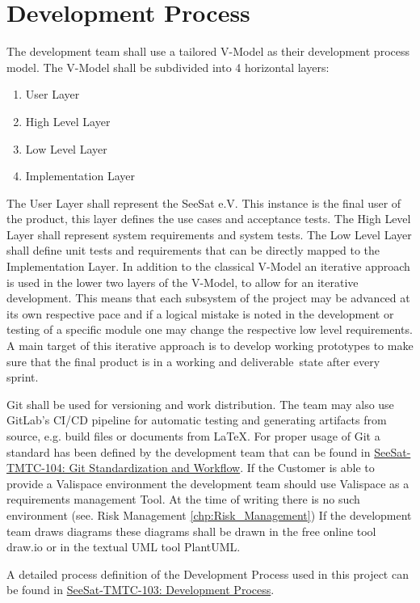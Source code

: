 \chapter{Development Process}

The development team shall use a tailored V-Model as their development process model. The V-Model shall be subdivided into 4 horizontal layers:

\begin{enumerate}
    \item User Layer
    \item High Level Layer
    \item Low Level Layer
    \item Implementation Layer
\end{enumerate}

The User Layer shall represent the SeeSat e.V. This instance is the final user of the product, this layer defines the use cases and acceptance tests. The High Level Layer shall represent system requirements and system tests. The Low Level Layer shall define unit tests and requirements that can be directly mapped to the Implementation Layer.
In addition to the classical V-Model an iterative approach is used in the lower two layers of the V-Model, to allow for an iterative development. This means that each subsystem of the project may be advanced at its own respective pace and if a logical mistake is noted in the development or testing of a specific module one may change the respective low level requirements. A main target of this iterative approach is to develop working prototypes to make sure that the final product is in a working and  \glqq deliverable\grqq~state after every sprint.

Git shall be used for versioning and work distribution. The team may also use GitLab's CI/CD pipeline for automatic testing and generating artifacts from source, e.g. build files or documents from \LaTeX. For proper usage of Git a standard has been defined by the development team that can be found in \href{https://nc.seesat.eu/apps/files/files/220350?dir=/Project/ERWIN/Engineering/TMTC/CCSDS-Stack/2.%20Iteration%20%28TSL23%29/WPD-TSL-0004%20%28TM%20Chain%29/Documents/Standardization/GitStandardizationAndWorkflow&editing=false&openfile=true}{SeeSat-TMTC-104: Git Standardization and Workflow}.
If the Customer is able to provide a Valispace environment the development team should use Valispace as a requirements management Tool. At the time of writing there is no such environment (see. Risk Management \ref{chp:Risk_Management})
If the development team draws diagrams these diagrams shall be drawn in the free online tool draw.io or in the textual UML tool PlantUML.

A detailed process definition of the Development Process used in this project can be found in \href{https://nc.seesat.eu/apps/files/favorites/220327?dir=/Project/ERWIN/Engineering/TMTC/CCSDS-Stack/2.%20Iteration%20%28TSL23%29/WPD-TSL-0004%20%28TM%20Chain%29/Documents/Standardization/DevelopmentProcess&editing=false&openfile=true}{SeeSat-TMTC-103: Development Process}.